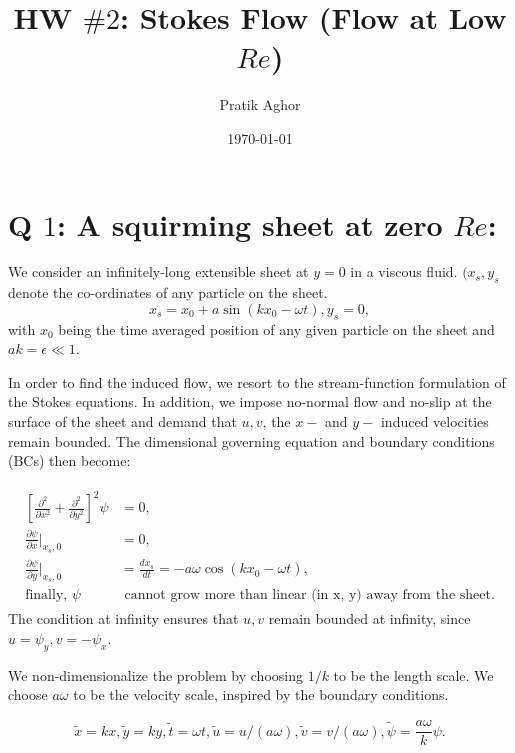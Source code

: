 \documentclass{article}
\author{Pratik Aghor}
\title{HW $\# 2$: Stokes Flow (Flow at Low $Re$)}
\date{\today}  %
\begin{document}
\maketitle
\section{Q $1$: A squirming sheet at zero $Re$: }
We consider an infinitely-long extensible sheet at $y = 0$ in a viscous fluid. $(x_{s}, y_{s}$ denote the co-ordinates of any particle on the sheet. 
\begin{equation}\label{eq:squriming_sheet}
 x_{s} = x_{0} + a \sin{(kx_{0} - \omega t)}, y_{s} = 0,
\end{equation}
with $x_{0}$ being the time averaged position of any given particle on the sheet and $ak = \epsilon \ll 1$.

In order to find the induced flow, we resort to the stream-function formulation of the Stokes equations. In addition, we impose no-normal flow and no-slip at the surface of the sheet and demand that $u, v$, the $x-$ and $y-$ induced velocities remain bounded. The dimensional governing equation and boundary conditions (BCs) then become:

\begin{align}\label{eq:dim_gov_eqn_bcs}
 \begin{split}
  \left[\frac{\partial^{2}}{\partial x^{2}} + \frac{\partial^{2}}{\partial y^{2}}\right]^{2} \psi &= 0, \\
  \frac{\partial \psi}{\partial x }\bigg|_{x_{s}, 0} & = 0, \\
  \frac{\partial \psi}{\partial y }\bigg|_{x_{s}, 0} &= \frac{dx_{s}}{dt} = - a\omega \cos{(kx_{0} - \omega t)},\\
  \textrm{finally, } \psi & \textrm{ cannot grow more than linear (in x, y) away from the sheet}.
 \end{split}
\end{align}
The condition at infinity ensures that $u, v$ remain bounded at infinity, since $u = \psi_{y}, v = -\psi_{x}$.

We non-dimensionalize the problem by choosing $1/k$ to be the length scale. We choose $a\omega$ to be the velocity scale, inspired by the boundary conditions. 

\begin{equation}\label{eq:squriming_sheet_scalings}
 \tilde{x} = kx, \tilde{y} = ky, \tilde{t} = \omega t, \tilde{u} =  u/(a\omega), \tilde{v} =  v/(a\omega), \tilde{\psi} = \frac{a\omega}{k}\psi. 
\end{equation}
\end{document}
